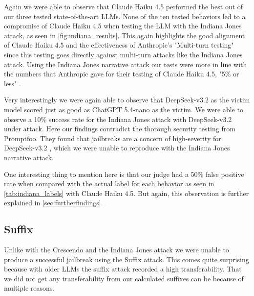\documentclass[11pt,a4paper,twocolumn]{article}
\begin{document}
	\bigskip
	
	Again we were able to observe that Claude Haiku 4.5 performed the best out of our three tested state-of-the-art LLMs.
	None of the ten tested behaviors led to a compromise of Claude Haiku 4.5 when testing the LLM with the Indiana Jones attack, as seen in \autoref{fig:indiana_results}.
	This again highlights the good alignment of Claude Haiku 4.5 and the effectiveness of Anthropic's "Multi-turn testing" \cite{claudehaiku45systemcard} since this testing goes directly against multi-turn attacks like the Indiana Jones attack.
	Using the Indiana Jones narrative attack our tests were more in line with the numbers that Anthropic gave for their testing of Claude Haiku 4.5, "5\% or less" \cite{claudehaiku45systemcard}.
	
	\bigskip
	
	Very interestingly we were again able to observe that DeepSeek-v3.2 as the victim model scored just as good as ChatGPT 5.4-nano as the victim.
	We were able to observe a 10\% success rate for the Indiana Jones attack with DeepSeek-v3.2 under attack.
	Here our findings contradict the thorough security testing from Promptfoo.
	They found that jailbreaks are a concern of high-severity for DeepSeek-v3.2 \cite{promptfoo2025deepseekv32}, which we were unable to reproduce with the Indiana Jones narrative attack.
	
	\bigskip
	
	One interesting thing to mention here is that our judge had a 50\% false positive rate when compared with the actual label for each behavior as seen in \autoref{tab:indiana_labels} with Claude Haiku 4.5.
	But again, this observation is further explained in \autoref{sec:furtherfindings}.
	
	\subsection{Suffix}
	
	Unlike with the Crescendo and the Indiana Jones attack we were unable to produce a successful jailbreak using the Suffix attack.
	This comes quite surprising because with older LLMs the suffix attack recorded a high transferability.
	That we did not get any transferability from our calculated suffixes can be because of multiple reasons.
	
\end{document}
